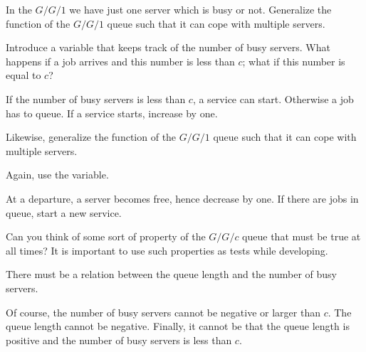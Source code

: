 \begin{exercise}
In the $G/G/1$ we have just one server which is busy or not.
  Generalize  the  function of the $G/G/1$ queue such that it can cope with multiple servers.

  \begin{hint}
  Introduce a  variable that keeps track of the number of busy servers. What happens if a job arrives and this number is less than $c$; what if this number is equal to $c$?
  \end{hint}
  \begin{solution}
    If the number of busy servers is less than $c$, a service can start. Otherwise a job has to queue. If a service starts, increase  by one. 
  \end{solution}
\end{exercise}


\begin{exercise}
Likewise,   generalize  the  function of the $G/G/1$ queue such that it can cope with multiple servers.
\begin{hint}
  Again, use the  variable. 
\end{hint}

\begin{solution}
  At a departure, a server becomes free, hence decrease  by one. If there are jobs in queue, start a new service.
\end{solution}
\end{exercise}

\begin{exercise}
  Can you think of some sort of property of the $G/G/c$ queue that must be true at all times? It is important to use such properties  as tests while developing.
  \begin{hint}
    There must be a relation between the queue length and the number of busy servers.
  \end{hint}
  \begin{solution}
    Of course, the number of busy servers cannot be negative or larger than $c$. The queue length cannot be negative. Finally, it cannot be that  the queue length is positive and the number of busy servers is less than $c$. 
  \end{solution}
\end{exercise}

